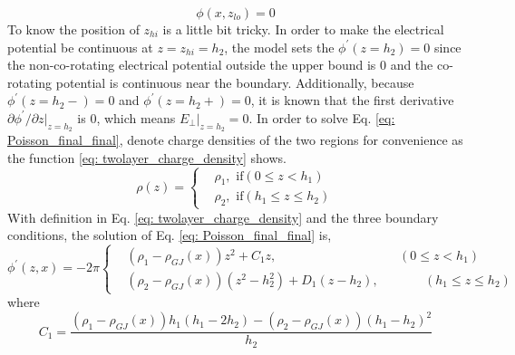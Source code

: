 \documentclass[12pt]{report}
\begin{document}
      \begin{equation}
        \label{eq: lower_boundary}
        \phi \left(x, z_{lo}\right) = 0
      \end{equation}
      To know the position of $z_{hi}$ is a little bit tricky. In order to make the electrical 
      potential be continuous at $z = z_{hi} = h_2$, the model sets the 
      $\phi^{\prime}\left(z=h_{2}\right) = 0$ since the non-co-rotating electrical potential 
      outside the upper bound is $0$ and the co-rotating potential is continuous near the 
      boundary. Additionally, because $\phi^{\prime}\left(z=h_{2}-\right) = 0$
      and $\phi^{\prime}\left(z=h_{2}+\right) = 0$, it is known that the first derivative 
      $\partial{\phi^{\prime}}/\partial{z}\vert_{z=h_{2}}$ is $0$, which means 
      $E_{\perp}\vert_{z=h_{2}} = 0$. In order to solve Eq. \ref{eq: Poisson_final_final}, 
      denote charge densities of the two regions for convenience as the function 
      \ref{eq: twolayer_charge_density} shows.
      \begin{equation}
        \label{eq: twolayer_charge_density}
          \rho\left(z\right) = 
          \begin{cases}
             & \rho_{1} , \text{    if} \left(0 \leq z < h_{1}\right)\\
             & \rho_{2} , \text{    if} \left(h_{1} \leq z \leq h_{2}\right) 
          \end{cases}       
      \end{equation}
      With definition in Eq. \ref{eq: twolayer_charge_density} and the three boundary 
      conditions, the solution of Eq. \ref{eq: Poisson_final_final} is, 
      \begin{equation}
        \label{eq: twolayer_potential}
          \phi^{\prime}\left(z, x\right) = -2\pi
          \left\{\begin{alignedat}{2}
             & \left(\rho_{1} - \rho_{GJ}\left(x\right)\right)z^2 + C_{1} z ,  &&\left(0 \leq z < h_{1}\right)\\
             & \left(\rho_{2}-\rho_{GJ}\left(x\right)\right)\left(z^2 - h_2^2\right) + D_{1} \left(z-h_2\right),  &&\qquad \left(h_{1} \leq z \leq h_{2}\right) 
          \end{alignedat}\right.
      \end{equation}
      where 
      \begin{equation*}
        C_{1} = \frac{\left(\rho_{1}-\rho_{GJ}\left(x\right)\right)h_1\left(h_1-2h_2\right)-\left(\rho_2-\rho_{GJ}\left(x\right)\right)\left(h_1-h_2\right)^2}{h_2} 
      \end{equation*}
\end{document}
